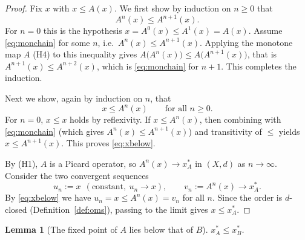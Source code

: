 \documentclass{amsart}
\theoremstyle{plain}
\newtheorem{lemma}{Lemma}
\theoremstyle{definition}
\newcommand{\xA}{x^{*}_{A}}
\newcommand{\xB}{x^{*}_{B}}
\begin{document}
\begin{proof}
Fix $x$ with $x\le A(x)$. We first show by induction on $n\ge 0$ that
\begin{equation}\label{eq:monchain}
   A^{n}(x)\le A^{n+1}(x).
\end{equation}
For $n=0$ this is the hypothesis $x=A^{0}(x)\le A^{1}(x)=A(x)$. Assume
\eqref{eq:monchain} for some $n$, i.e.\ $A^{n}(x)\le A^{n+1}(x)$. Applying the
monotone map $A$ (H4) to this inequality gives
$A\bigl(A^{n}(x)\bigr)\le A\bigl(A^{n+1}(x)\bigr)$, that is
$A^{n+1}(x)\le A^{n+2}(x)$, which is \eqref{eq:monchain} for $n+1$. This
completes the induction.

Next we show, again by induction on $n$, that
\begin{equation}\label{eq:xbelow}
   x\le A^{n}(x)\qquad\text{for all }n\ge 0 .
\end{equation}
For $n=0$, $x\le x$ holds by reflexivity. If $x\le A^{n}(x)$, then combining
with \eqref{eq:monchain} (which gives $A^{n}(x)\le A^{n+1}(x)$) and
transitivity of $\le$ yields $x\le A^{n+1}(x)$. This proves
\eqref{eq:xbelow}.

By (H1), $A$ is a Picard operator, so $A^{n}(x)\to\xA$ in $(X,d)$ as
$n\to\infty$. Consider the two convergent sequences
\[
   u_n:=x\ \ (\text{constant}, \ u_n\to x),\qquad
   v_n:=A^{n}(x)\to \xA .
\]
By \eqref{eq:xbelow} we have $u_n=x\le A^{n}(x)=v_n$ for all $n$. Since the
order is $d$-closed (Definition~\ref{def:oms}), passing to the limit gives
$x\le \xA$.
\end{proof}

\begin{lemma}[The fixed point of $A$ lies below that of $B$]\label{lem:fp}
$\xA\le \xB$.
\end{lemma}
\end{document}
